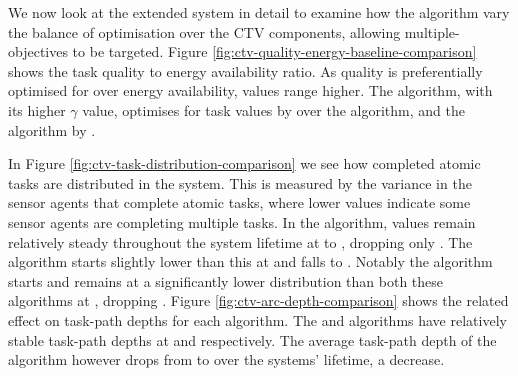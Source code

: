 We now look at the extended system in detail to examine how the algorithm vary the balance  of optimisation over the CTV components, allowing multiple-objectives to be targeted. Figure 	\ref{fig:ctv-quality-energy-baseline-comparison} shows the task quality to energy availability ratio. 
As quality is preferentially optimised for over energy availability, values range higher. The \algorithmQuality{}{} algorithm, with its higher $\gamma$ value, optimises for task values by \resultsQEQualityEnd{}{} over the \algorithmEnergy{}{} algorithm, and the \algorithmDistribution{}{} algorithm by \resultsQEDistDiff{}{}. 

In Figure \ref{fig:ctv-task-distribution-comparison} we see how completed atomic tasks are distributed in the system. This is measured by the variance in the sensor agents that complete atomic tasks, where lower values indicate some sensor agents are completing multiple tasks. In the \algorithmDistribution{}{} algorithm, values remain relatively steady throughout the system lifetime at \resultsTaskDistDistStart{}{} to \resultsTaskDistDistEnd{}{}, dropping only \resultsTaskDistDistPercent{}{}. The \algorithmQuality{}{} algorithm starts slightly lower than this at \resultsTaskDistQualityStart{}{} and falls \resultsTaskDistQualityPercent{}{} to \resultsTaskDistQualityEnd{}{}. Notably the \algorithmEnergy{}{} algorithm starts and remains at a significantly lower distribution than both these algorithms at \resultsTaskDistEnergyEnd{}{}, dropping \resultsTaskDistEnergydPercent{}{}. Figure
\ref{fig:ctv-arc-depth-comparison} shows the related effect on task-path depths for each algorithm. The \algorithmQuality{}{} and \algorithmDistribution{}{} algorithms have relatively stable task-path depths at \resultsArcDepthQualityEnd{}{} and \resultsArcDepthDistEnd{}{} respectively. The average task-path depth of the \algorithmEnergy{}{} algorithm however drops from \resultsArcDepthEnergyStart{}{} to  \resultsArcDepthEnergyEnd{}{} over the systems' lifetime, a \resultsArcDepthEnergyPercent{}{} decrease.


